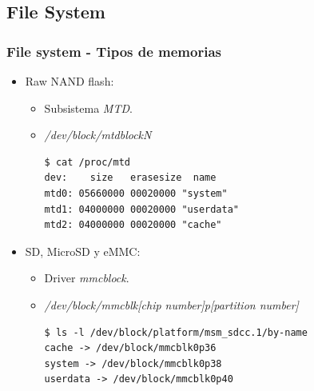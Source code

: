 \subsection{File System}
\begin{frame}[fragile]
  \frametitle{File system - Tipos de memorias}
  \begin{itemize}
      \item Raw NAND flash:
      \begin{itemize}
    \item Subsistema \textit{MTD}.
    
    \item \textit{/dev/block/mtdblockN}
    
    \begin{lstlisting}
$ cat /proc/mtd                                                 
dev:    size   erasesize  name
mtd0: 05660000 00020000 "system"
mtd1: 04000000 00020000 "userdata"
mtd2: 04000000 00020000 "cache"
    \end{lstlisting}
      \end{itemize} 
      
      \item SD, MicroSD y eMMC:
      \begin{itemize}
    \item Driver \textit{mmcblock}.
    
    \item \textit{/dev/block/mmcblk[chip number]p[partition number]}
    
    \begin{lstlisting}
$ ls -l /dev/block/platform/msm_sdcc.1/by-name
cache -> /dev/block/mmcblk0p36
system -> /dev/block/mmcblk0p38
userdata -> /dev/block/mmcblk0p40
    \end{lstlisting}
      \end{itemize}
  \end{itemize}
\end{frame}

